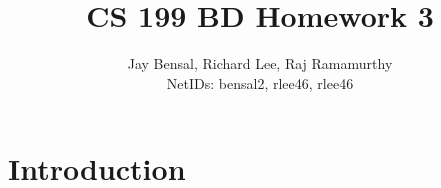 \documentclass{article}
\begin{document}
\title{CS 199 BD Homework 3}
\author{Jay Bensal, Richard Lee, Raj Ramamurthy\\
  NetIDs: bensal2, rlee46, rlee46}

\maketitle

\section{Introduction}
\end{document}
